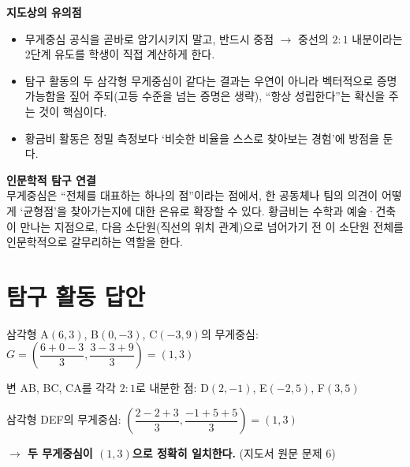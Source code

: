 \documentclass[11pt,a4paper]{article}
\begin{document}
\vspace{8pt}
\begin{minipage}[t]{0.48\linewidth}
\begin{calloutbox}
\textbf{지도상의 유의점}
\begin{itemize}[leftmargin=1.2em, itemsep=2pt, topsep=4pt]
  \item 무게중심 공식을 곧바로 암기시키지 말고, 반드시 중점 $\to$ 중선의 $2:1$ 내분이라는 2단계 유도를 학생이 직접 계산하게 한다.
  \item 탐구 활동의 두 삼각형 무게중심이 같다는 결과는 우연이 아니라 벡터적으로 증명 가능함을 짚어 주되(고등 수준을 넘는 증명은 생략), ``항상 성립한다''는 확신을 주는 것이 핵심이다.
  \item 황금비 활동은 정밀 측정보다 `비슷한 비율을 스스로 찾아보는 경험'에 방점을 둔다.
\end{itemize}
\end{calloutbox}
\end{minipage}\hfill
\begin{minipage}[t]{0.48\linewidth}
\begin{notebox}
\textbf{인문학적 탐구 연결}\\
무게중심은 ``전체를 대표하는 하나의 점''이라는 점에서, 한 공동체나 팀의 의견이 어떻게 `균형점'을 찾아가는지에 대한 은유로 확장할 수 있다. 황금비는 수학과 예술·건축이 만나는 지점으로, 다음 소단원(직선의 위치 관계)으로 넘어가기 전 이 소단원 전체를 인문학적으로 갈무리하는 역할을 한다.
\end{notebox}
\end{minipage}

\section{탐구 활동 답안}

\begin{answerbox}
삼각형 A$(6,3)$, B$(0,-3)$, C$(-3,9)$의 무게중심: $G=\left(\dfrac{6+0-3}{3},\dfrac{3-3+9}{3}\right)=(1,3)$

\vspace{4pt}
변 AB, BC, CA를 각각 $2:1$로 내분한 점: D$(2,-1)$, E$(-2,5)$, F$(3,5)$

\vspace{4pt}
삼각형 DEF의 무게중심: $\left(\dfrac{2-2+3}{3},\dfrac{-1+5+5}{3}\right)=(1,3)$

\textbf{\color{goldstrong}$\to$ 두 무게중심이 $(1,3)$으로 정확히 일치한다.} (지도서 원문 문제 6)
\end{answerbox}
\end{document}
